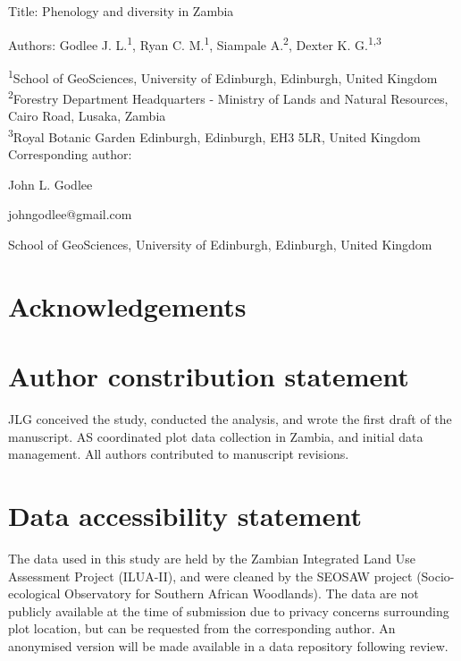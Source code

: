 \documentclass[11pt,a4paper]{article}
\newcommand{\titletext}{Phenology and diversity in Zambia}
\begin{document}
{\Large{Title: \titletext{}}}

Authors: Godlee J. L.\textsuperscript{1}, Ryan C. M.\textsuperscript{1}, Siampale A.\textsuperscript{2}, Dexter K. G.\textsuperscript{1,3}

\textsuperscript{1}School of GeoSciences, University of Edinburgh, Edinburgh, United Kingdom \\
\textsuperscript{2}Forestry Department Headquarters - Ministry of Lands and Natural Resources, Cairo Road, Lusaka, Zambia \\
\textsuperscript{3}Royal Botanic Garden Edinburgh, Edinburgh, EH3 5LR, United Kingdom \\

\vspace{1em}
Corresponding author:

John L. Godlee

johngodlee@gmail.com

School of GeoSciences, University of Edinburgh, Edinburgh, United Kingdom

\section*{Acknowledgements}

\section*{Author constribution statement}

JLG conceived the study, conducted the analysis, and wrote the first draft of the manuscript. AS coordinated plot data collection in Zambia, and initial data management. All authors contributed to manuscript revisions. 

\section*{Data accessibility statement}

The data used in this study are held by the Zambian Integrated Land Use Assessment Project (ILUA-II), and were cleaned by the SEOSAW project (Socio-ecological Observatory for Southern African Woodlands). The data are not publicly available at the time of submission due to privacy concerns surrounding plot location, but can be requested from the corresponding author. An anonymised version will be made available in a data repository following review.

\newpage{}
\linenumbers
\end{document}
